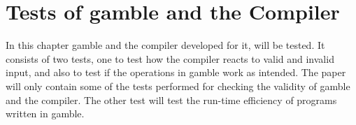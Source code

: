 \chapter{Tests of \gls{gamble} and the Compiler} %
In this chapter \gls{gamble} and the compiler developed for it, will be tested.
It consists of two tests, one to test how the compiler reacts to valid and invalid input, and also to test if the operations in \gls{gamble} work as intended.
The paper will only contain some of the tests performed for checking the validity of \gls{gamble} and the compiler.
The other test will test the run-time efficiency of programs written in \gls{gamble}.

